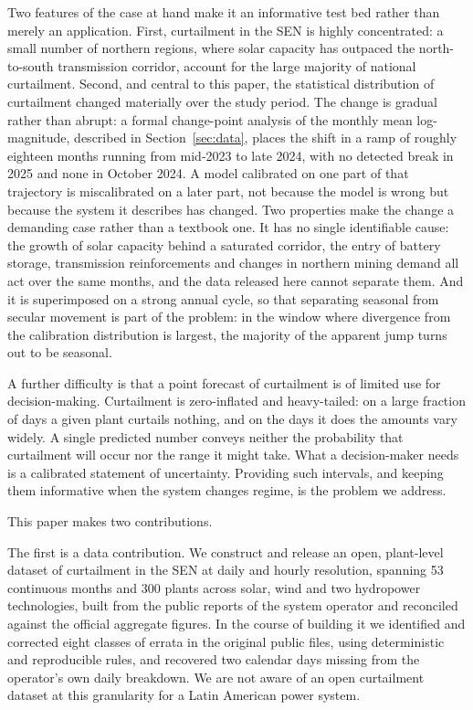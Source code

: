 \documentclass[preprint,3p,times]{elsarticle}
\begin{document}
Two features of the case at hand make it an informative test bed rather than merely an application. First, curtailment in the SEN is highly concentrated: a small number of northern regions, where solar capacity has outpaced the north-to-south transmission corridor, account for the large majority of national curtailment. Second, and central to this paper, the statistical distribution of curtailment changed materially over the study period. The change is gradual rather than abrupt: a formal change-point analysis of the monthly mean log-magnitude, described in Section~\ref{sec:data}, places the shift in a ramp of roughly eighteen months running from mid-2023 to late 2024, with no detected break in 2025 and none in October 2024. A model calibrated on one part of that trajectory is miscalibrated on a later part, not because the model is wrong but because the system it describes has changed. Two properties make the change a demanding case rather than a textbook one. It has no single identifiable cause: the growth of solar capacity behind a saturated corridor, the entry of battery storage, transmission reinforcements and changes in northern mining demand all act over the same months, and the data released here cannot separate them. And it is superimposed on a strong annual cycle, so that separating seasonal from secular movement is part of the problem: in the window where divergence from the calibration distribution is largest, the majority of the apparent jump turns out to be seasonal.

A further difficulty is that a point forecast of curtailment is of limited use for decision-making. Curtailment is zero-inflated and heavy-tailed: on a large fraction of days a given plant curtails nothing, and on the days it does the amounts vary widely. A single predicted number conveys neither the probability that curtailment will occur nor the range it might take. What a decision-maker needs is a calibrated statement of uncertainty. Providing such intervals, and keeping them informative when the system changes regime, is the problem we address.

This paper makes two contributions.

The first is a data contribution. We construct and release an open, plant-level dataset of curtailment in the SEN at daily and hourly resolution, spanning 53 continuous months and 300 plants across solar, wind and two hydropower technologies, built from the public reports of the system operator and reconciled against the official aggregate figures. In the course of building it we identified and corrected eight classes of errata in the original public files, using deterministic and reproducible rules, and recovered two calendar days missing from the operator's own daily breakdown. We are not aware of an open curtailment dataset at this granularity for a Latin American power system.
\end{document}
